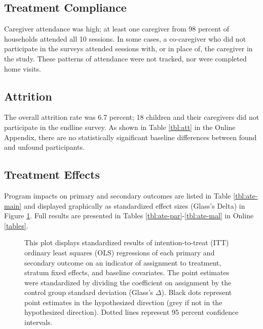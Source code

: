 \documentclass[12pt,authoryear]{elsarticle}\usepackage{knitr}
\begin{document}
\subsection*{Treatment Compliance}

Caregiver attendance was high; at least one caregiver from 98 percent of households attended all 10 sessions. In some cases, a co-caregiver who did not participate in the surveys attended sessions with, or in place of, the caregiver in the study. These patterns of attendance were not tracked, nor were completed home visits.  

\subsection*{Attrition}

The overall attrition rate was 6.7 percent; 18 children and their caregivers did not participate in the endline survey. As shown in Table \ref{tbl:att} in the Online Appendix, there are no statistically significant baseline differences between found and unfound participants.

\subsection*{Treatment Effects}

Program impacts on primary and secondary outcomes are listed in Table \ref{tbl:ate-main} and displayed graphically as standardized effect sizes (Glass's Delta) in Figure \ref{fig:ate-main}. Full results are presented in Tables \ref{tbl:ate-par}-\ref{tbl:ate-mal} in Online \ref{tables}. 



\begin{figure}
  \centerline{}
  \caption{This plot displays standardized results of intention-to-treat (ITT) ordinary least squares (OLS) regressions of each primary and secondary outcome on an indicator of assignment to treatment, stratum fixed effects, and baseline covariates. The point estimates were standardized by dividing the coefficient on assignment by the control group standard deviation (Glass's $\Delta$). Black dots represent point estimates in the hypothesized direction (grey if not in the hypothesized direction). Dotted lines represent 95 percent confidence intervals.}
  \label{fig:ate-main}
\end{figure}
\end{document}
